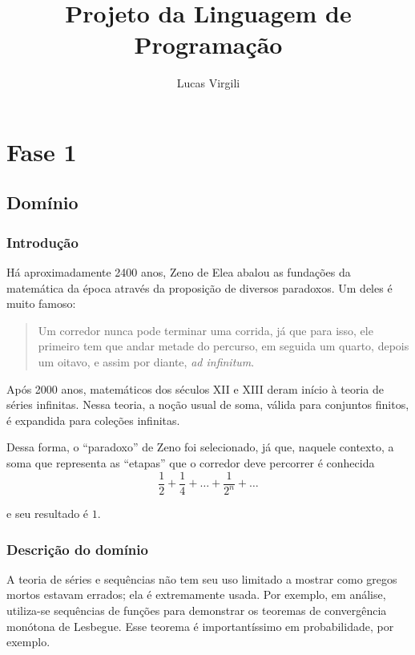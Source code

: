 \documentclass[a4 paper, 12pt]{article}
\title{Projeto da Linguagem de Programa\c c\~ao}
\author{Lucas Virgili}
\date{}
\begin{document}
\maketitle
\tableofcontents
\section{Fase 1}
\subsection{Dom\'inio}
\subsubsection{Introdu\c c\~ao}
H\'a aproximadamente 2400 anos, Zeno de Elea abalou as funda\c
c\~oes da matem\'atica da \'epoca atrav\'es da proposi\c c\~ao de
diversos paradoxos. Um deles \'e muito famoso:

\begin{quotation}
  Um corredor nunca pode terminar uma corrida, j\'a que para isso,
  ele primeiro tem que andar metade do percurso, em seguida um quarto,
  depois um oitavo, e assim por diante, \emph{ad infinitum}.
\end{quotation}

Ap\'os 2000 anos, matem\'aticos dos s\'eculos XII e XIII deram
in\'icio \`a teoria de s\'eries infinitas. Nessa teoria, a no\c c\~ao
usual de soma, v\'alida para conjuntos finitos, \'e expandida para
cole\c c\~oes infinitas.

Dessa forma, o ``paradoxo'' de Zeno foi selecionado, j\'a que, naquele
contexto, a soma que representa as ``etapas'' que o corredor deve
percorrer \'e conhecida
\begin{equation}
  \frac{1}{2} + \frac{1}{4} + \ldots + \frac{1}{2^n} + \ldots
\end{equation}

e seu resultado \'e $1$.

\subsubsection{Descri\c c\~ao do dom\'inio}
A teoria de s\'eries e sequ\^encias n\~ao tem seu uso limitado a
mostrar como gregos mortos estavam errados; ela \'e extremamente
usada. Por exemplo, em an\'alise, utiliza-se sequ\^encias de fun\c
c\~oes para demonstrar os teoremas de converg\^encia mon\'otona de
Lesbegue. Esse teorema \'e important\'issimo em probabilidade, por
exemplo.
\end{document}
